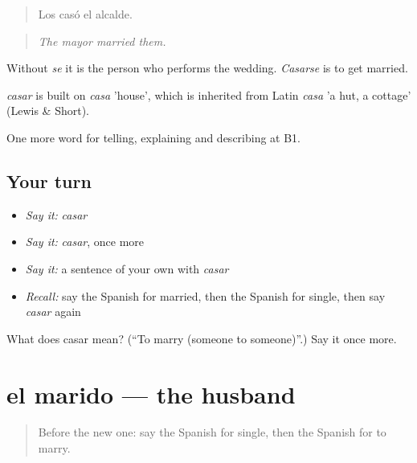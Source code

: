 \begin{quote}
Los casó el alcalde.
\end{quote}

\begin{quote}
\emph{The mayor married them.}
\end{quote}

Without \emph{se} it is the person who performs the wedding. \emph{Casarse} is to get married.

\begin{cousinweb}
\emph{casar} is built on \emph{casa} 'house', which is inherited from Latin \emph{casa} 'a hut, a cottage' (Lewis \& Short).
\end{cousinweb}

\begin{grammarlens}[title={What you've built}]
One more word for telling, explaining and describing at B1.
\end{grammarlens}

\subsection*{Your turn}
\begin{itemize}
\raggedright
  \item \emph{Say it:} \emph{casar}
  \item \emph{Say it:} \emph{casar}, once more
  \item \emph{Say it:} a sentence of your own with \emph{casar}
  \item \emph{Recall:} say the Spanish for married, then the Spanish for single, then say \emph{casar} again
\end{itemize}

\begin{tcolorbox}[breakable,colback=teal!4,colframe=teal!35!black,title={Before you move on}]
What does casar mean? (\textquotedblleft{}To marry (someone to someone)\textquotedblright{}.) Say it once more.
\end{tcolorbox}
\section[el marido]{el marido — the husband}

\label{lesson:ES-C549-marido}



\begin{quote}
Before the new one: say the Spanish for single, then the Spanish for to marry.
\end{quote}

